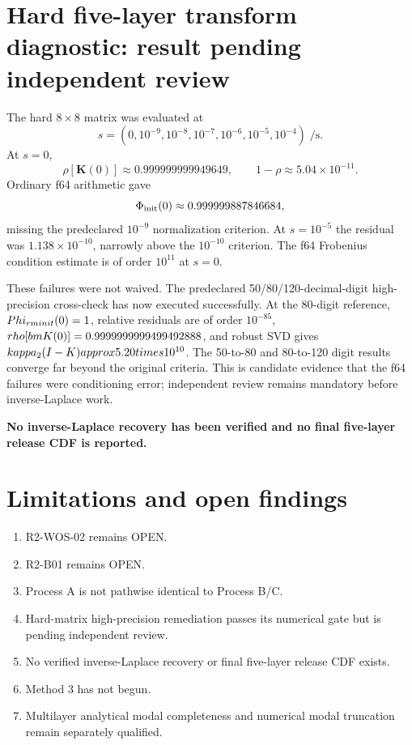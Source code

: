 \documentclass[11pt]{article}
\begin{document}
\section{Hard five-layer transform diagnostic: result pending independent review}
The hard $8\times8$ matrix was evaluated at
\begin{equation}
s=(0,10^{-9},10^{-8},10^{-7},10^{-6},10^{-5},10^{-4})\;\si{\per\second}.
\end{equation}
At $s=0$,
\begin{equation}
\rho[\bm K(0)]\approx0.999999999949649,\qquad
1-\rho\approx5.04\times10^{-11}.
\end{equation}
Ordinary f64 arithmetic gave
\begin{equation}
\Phi_{\rm init}(0)\approx0.999999887846684,
\end{equation}
missing the predeclared $10^{-9}$ normalization criterion. At $s=10^{-5}$ the residual was $1.138\times10^{-10}$, narrowly above the $10^{-10}$ criterion. The f64 Frobenius condition estimate is of order $10^{11}$ at $s=0$.

These failures were not waived. The predeclared 50/80/120-decimal-digit high-precision cross-check has now executed successfully. At the 80-digit reference, $\\Phi_{\\rm init}(0)=1$, relative residuals are of order $10^{-85}$, $\\rho[\\bm K(0)]=0.9999999999499492888$, and robust SVD gives $\\kappa_2(I-K)\\approx5.20\\times10^{10}$. The 50-to-80 and 80-to-120 digit results converge far beyond the original criteria. This is candidate evidence that the f64 failures were conditioning error; independent review remains mandatory before inverse-Laplace work.

\textbf{No inverse-Laplace recovery has been verified and no final five-layer release CDF is reported.}

\section{Limitations and open findings}
\begin{enumerate}
\item R2-WOS-02 remains OPEN.
\item R2-B01 remains OPEN.
\item Process A is not pathwise identical to Process B/C.
\item Hard-matrix high-precision remediation passes its numerical gate but is pending independent review.
\item No verified inverse-Laplace recovery or final five-layer release CDF exists.
\item Method 3 has not begun.
\item Multilayer analytical modal completeness and numerical modal truncation remain separately qualified.
\end{enumerate}
\end{document}
